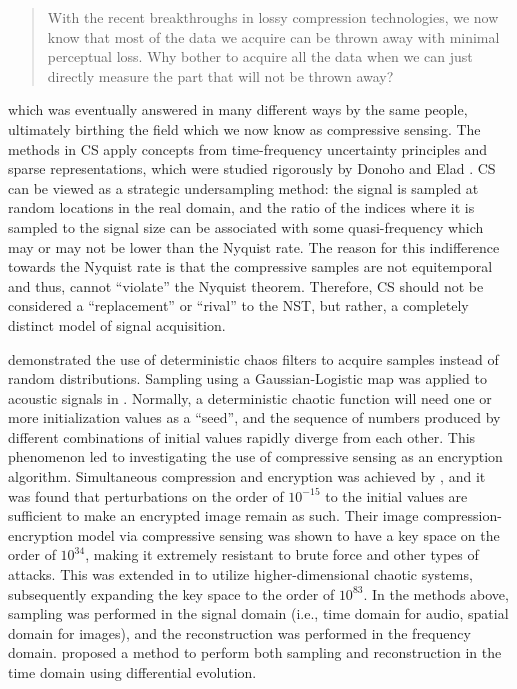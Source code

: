 \begin{quote}
	With the recent breakthroughs in lossy compression technologies, we now know that most of the data we acquire can be thrown away with minimal perceptual loss. Why bother to acquire all the data when we can just directly measure the part that will not be thrown away?
\end{quote}

\noindent which was eventually answered in many different ways by the same people, ultimately birthing the field which we now know as compressive sensing. The methods in CS apply concepts from time-frequency uncertainty principles \cite{Donoho2001} and sparse representations, which were studied rigorously by Donoho and Elad \cite{Donoho2003}. CS can be viewed as a strategic undersampling method: the signal is sampled at random locations in the real domain, and the ratio of the indices where it is sampled to the signal size can be associated with some quasi-frequency which may or may not be lower than the Nyquist rate. The reason for this indifference towards the Nyquist rate is that the compressive samples are not equitemporal and thus, cannot ``violate'' the Nyquist theorem. Therefore, CS should not be considered a ``replacement'' or ``rival'' to the NST, but rather, a completely distinct model of signal acquisition.

\cite{LinhTrung2008} demonstrated the use of deterministic chaos filters to acquire samples instead of random distributions. Sampling using a Gaussian-Logistic map was applied to acoustic signals in \cite{Mathew2016}. Normally, a deterministic chaotic function will need one or more initialization values as a ``seed'', and the sequence of numbers produced by different combinations of initial values rapidly diverge from each other. This phenomenon led to investigating the use of compressive sensing as an encryption algorithm. Simultaneous compression and encryption was achieved by \cite{Mo2013}, and it was found that perturbations on the order of $10^{-15}$ to the initial values are sufficient to make an encrypted image remain as such. Their image compression-encryption model via compressive sensing was shown to have a key space on the order of $10^{34}$, making it extremely resistant to brute force and other types of attacks. This was extended in \cite{Zhou2016} to utilize higher-dimensional chaotic systems, subsequently expanding the key space to the order of $10^{83}$. In the methods above, sampling was performed in the signal domain (i.e., time domain for audio, spatial domain for images), and the reconstruction was performed in the frequency domain. \cite{Andras2018} proposed a method to perform both sampling and reconstruction in the time domain using differential evolution.

